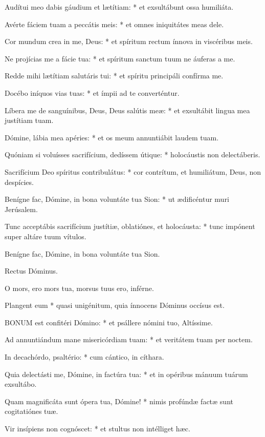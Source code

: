 Audítui meo dabis gáudium et lætítiam: * et exsultábunt ossa humiliáta.

Avérte fáciem tuam a peccátis meis: * et omnes iniquitátes meas dele.

Cor mundum crea in me, Deus: * et spíritum rectum ínnova in viscéribus meis.

Ne projícias me a fácie tua: * et spíritum sanctum tuum ne áuferas a me.

Redde mihi lætítiam salutáris tui: * et spíritu principáli confírma me.

Docébo iníquos vias tuas: * et ímpii ad te converténtur.

Líbera me de sanguínibus, Deus, Deus salútis meæ: * et exsultábit lingua mea justítiam tuam.

Dómine, lábia mea apéries: * et os meum annuntiábit laudem tuam.

Quóniam si voluísses sacrifícium, dedíssem útique: * holocáustis non delectáberis.

Sacrifícium Deo spíritus contribulátus: * cor contrítum, et humiliátum, Deus, non despícies.

Benígne fac, Dómine, in bona voluntáte tua Sion: * ut ædificéntur muri Jerúsalem.

Tunc acceptábis sacrifícium justítiæ, oblatiónes, et holocáusta: * tunc impónent super altáre tuum vítulos.

 Benígne fac, Dómine, in bona voluntáte tua Sion.

 Rectus Dóminus.


 O mors, ero mors tua, morsus tuus ero, inférne.

 Plangent eum * quasi unigénitum, quia ínnocens Dóminus occísus est.


\lettrine[lines=2]{B}{ONUM} est confitéri Dómino: * et psállere nómini tuo, Altíssime.

Ad annuntiándum mane misericórdiam tuam: * et veritátem tuam per noctem.

In decachórdo, psaltério: * cum cántico, in cíthara.

Quia delectásti me, Dómine, in factúra tua: * et in opéribus mánuum tuárum exsultábo.

Quam magnificáta sunt ópera tua, Dómine! * nimis profúndæ factæ sunt cogitatiónes tuæ.

Vir insípiens non cognóscet: * et stultus non intélliget hæc.

